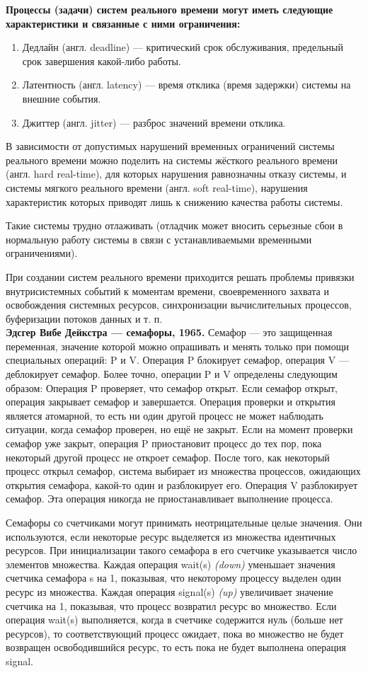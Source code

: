 \documentclass[12pt, a4paper]{article}
\begin{document}
\textbf{Процессы (задачи) систем реального времени могут иметь следующие характеристики и связанные с ними ограничения:}
\begin{enumerate}
    \item Дедлайн (англ. deadline) — критический срок обслуживания, предельный срок завершения какой-либо работы.
    \item Латентность (англ. latency) — время отклика (время задержки) системы на внешние события.
    \item Джиттер (англ. jitter) — разброс значений времени отклика.
\end{enumerate}

В зависимости от допустимых нарушений временных ограничений системы реального времени можно поделить на системы жёсткого реального времени (англ. hard real-time), для которых нарушения равнозначны отказу системы, и системы мягкого реального времени (англ. soft real-time), нарушения характеристик которых приводят лишь к снижению качества работы системы. 

Такие системы трудно отлаживать (отладчик может вносить серьезные сбои в нормальную работу системы в связи с устанавливаемыми временными ограничениями).

При создании систем реального времени приходится решать проблемы привязки внутрисистемных событий к моментам времени, своевременного захвата и освобождения системных ресурсов, синхронизации вычислительных процессов, буферизации потоков данных и т. п.\\

\textbf{Эдсгер Вибе Дейкстра --- семафоры, 1965.} Семафор --- это защищенная переменная, значение которой можно опрашивать и менять только при помощи специальных операций: P и V. Операция P блокирует семафор, операция V — деблокирует семафор. Более точно, операции P и V определены следующим образом: Операция P проверяет, что семафор открыт. Если семафор открыт, операция закрывает семафор и завершается. Операция проверки и открытия является атомарной, то есть ни один другой процесс не может наблюдать ситуации, когда семафор проверен, но ещё не закрыт. Если на момент проверки семафор уже закрыт, операция P приостановит процесс до тех пор, пока некоторый другой процесс не откроет семафор. После того, как некоторый процесс открыл семафор, система выбирает из множества процессов, ожидающих открытия семафора, какой-то один и разблокирует его. Операция V разблокирует семафор. Эта операция никогда не приостанавливает выполнение процесса. 

Семафоры со счетчиками могут принимать неотрицательные целые значения. Они используются, если некоторые ресурс выделяется из множества идентичных ресурсов. При инициализации такого семафора в его счетчике указывается число элементов множества. Каждая операция wait(s) \textit{(down)} уменьшает значения счетчика семафора s на 1, показывая, что некоторому процессу выделен один ресурс из множества. Каждая операция signal(s) \textit{(up)} увеличивает значение счетчика на 1, показывая, что процесс возвратил ресурс во множество. Если операция wait(s) выполняется, когда в счетчике содержится нуль (больше нет ресурсов), то соответствующий процесс ожидает, пока во множество не будет возвращен освободившийся ресурс, то есть пока не будет выполнена операция signal. 
\end{document}
